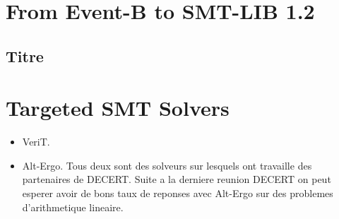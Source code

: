 \section{From Event-B to SMT-LIB 1.2}

\subsection{Titre}

\paragraph{}

\section{Targeted SMT Solvers}
\begin{itemize}
\item VeriT.
\item Alt-Ergo.
Tous deux sont des solveurs sur lesquels ont travaille des partenaires de DECERT.
Suite a la derniere reunion DECERT on peut esperer avoir de bons taux de reponses avec Alt-Ergo sur des problemes d'arithmetique lineaire.
\end{itemize}
